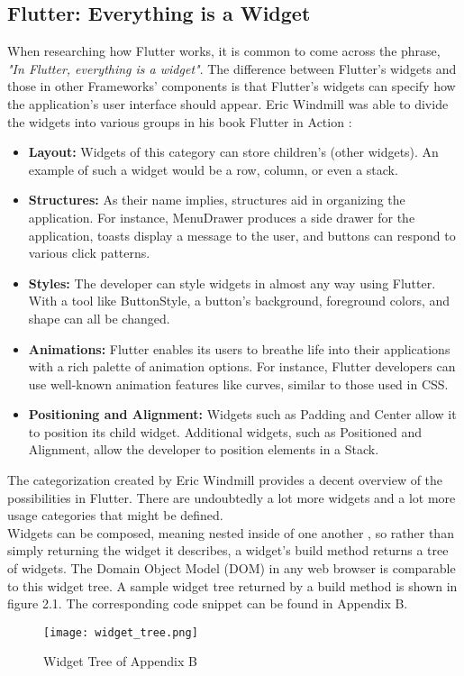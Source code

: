 \subsection{Flutter: Everything is a Widget}
When researching how Flutter works, it is common to come across the phrase, \emph{"In Flutter, everything is a widget"}. The difference between Flutter's widgets and those in other Frameworks' components is that Flutter's widgets can specify how the application's user interface should appear. Eric Windmill was able to divide the widgets into various groups in his book Flutter in Action \cite[p. 58]{.flutterinaction}:

\begin{itemize}
	\item \textbf{Layout:} 
	Widgets of this category can store children's (other widgets). An example of such a widget would be a row, column, or even a stack.  
	\item \textbf{Structures:} 
	As their name implies, structures aid in organizing the application.
	For instance, MenuDrawer produces a side drawer for the application, toasts display a message to the user, and buttons can respond to various click patterns. 
	\item \textbf{Styles:} 
	The developer can style widgets in almost any way using Flutter. With a tool like ButtonStyle, a button's background, foreground colors, and shape can all be changed.
	\item \textbf{Animations:} 
	Flutter enables its users to breathe life into their applications with a rich palette of animation options. For instance, Flutter developers can use well-known animation features like curves, similar to those used in CSS. 
	\item \textbf{Positioning and Alignment:} 
	Widgets such as Padding and Center allow it to position its child widget. Additional widgets, such as Positioned and Alignment, allow the developer to position elements in a Stack.
\end{itemize}
\noindent 
The categorization created by Eric Windmill provides a decent overview of the possibilities in Flutter. There are undoubtedly a lot more widgets and a lot more usage categories that might be defined.
\newline \\
Widgets can be composed, meaning nested inside of one another \cite[p. 61]{.flutterinaction}, so rather than simply returning the widget it describes, a widget's build method returns a tree of widgets. The Domain Object Model (DOM) in any web browser is comparable to this widget tree. A sample widget tree returned by a build method is shown in figure 2.1. The corresponding code snippet can be found in Appendix B.
\begin{figure}[H]
	\centering
	\texttt{[image: widget\_tree.png]}
	\caption[Widget Tree of Listing 2.1]{Widget Tree of Appendix B}
\end{figure}

